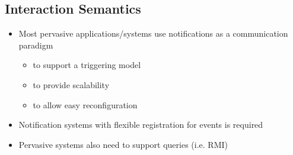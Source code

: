 \subsection{Interaction Semantics}
\begin{itemize}
	\item Most pervasive applications/systems use notifications as a communication paradigm
	\begin{itemize}
		\item to support a triggering model
		\item to provide scalability
		\item to allow easy reconfiguration
	\end{itemize}
	\item Notification systems with flexible registration for events is required
	\item Pervasive systems also need to support queries (i.e. RMI)	
\end{itemize}


















